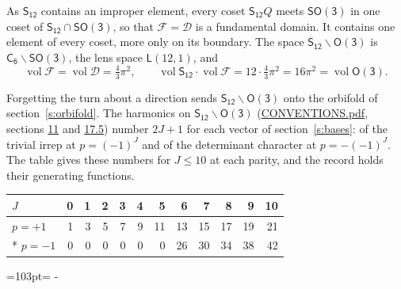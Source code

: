 \documentclass[10pt,a4paper]{article}
\newcommand{\needspace}[1]{\par\penalty-100\begingroup\dimen0=#1\relax\dimen2=\pagegoal
  \advance\dimen2-\pagetotal\ifdim\dimen0>\dimen2\relax\ifdim\dimen2>0pt\vfil\break\fi\fi
  \endgroup}
\numberwithin{equation}{section}
\newcommand{\grp}[1]{\mathsf{#1}}
\newcommand{\vol}{\operatorname{vol}}
\newcommand{\fcell}{\mathcal{D}}
\newcommand{\fdomain}{\mathcal{F}}
\newcommand{\lensspace}[2]{\mathsf{L}(#1, #2)}
\begin{document}
\leavevmode\label{n:set.fundamental}As $\grp{S_{12}}$ contains an improper element, every coset $\grp{S_{12}}Q$ meets \href{SO3.pdf}{$\grp{SO(3)}$} in one coset of $\grp{S_{12}} \cap \grp{SO(3)}$, so that $\fdomain = \fcell$ is a fundamental domain. It contains one element of every coset, more only on its boundary.
\leavevmode\label{n:set.lens}The space $\grp{S_{12}}\backslash\grp{O(3)}$ is $\grp{C_{6}}\backslash\grp{SO(3)}$, the lens space $\lensspace{12}{1}$, and
\begin{equation}\label{e:volume}\vol\fdomain = \vol\fcell = \tfrac{4}{3}\pi^2,\qquad \vol\grp{S_{12}}\cdot\vol\fdomain = 12\cdot \tfrac{4}{3}\pi^2 = 16\pi^2 = \vol\grp{O(3)}.\end{equation}

Forgetting the turn about a direction sends $\grp{S_{12}}\backslash\grp{O(3)}$ onto the orbifold of section~\ref{s:orbifold}.
The harmonics on $\grp{S_{12}}\backslash\grp{O(3)}$ (\href{../../CONVENTIONS.pdf}{CONVENTIONS.pdf}, sections \href{../../CONVENTIONS.pdf\#conv.11}{11} and \href{../../CONVENTIONS.pdf\#conv.17.5}{17.5}) number $2J + 1$ for each vector of section~\ref{s:bases}: of the trivial irrep at $p = (-1)^J$ and of the determinant character at $p = -(-1)^J$. The table gives these numbers for $J \le 10$ at each parity, and the record holds their generating functions.
{\small\setlength{\tabcolsep}{4pt}\begin{longtable}{@{}lrrrrrrrrrrr@{}}\toprule
$J$ & 0 & 1 & 2 & 3 & 4 & 5 & 6 & 7 & 8 & 9 & 10\\\midrule\endhead
\bottomrule\endfoot\endlastfoot
$p = +1$ & 1 & 3 & 5 & 7 & 9 & 11 & 13 & 15 & 17 & 19 & 21\\*
$p = -1$ & 0 & 0 & 0 & 0 & 0 & 0 & 26 & 30 & 34 & 38 & 42\\
\bottomrule\end{longtable}}
\needspace{103pt}
\end{document}

